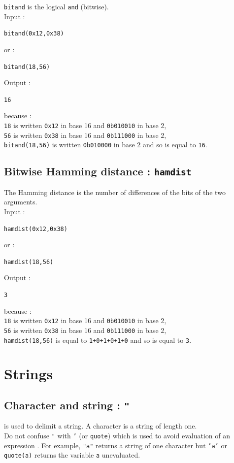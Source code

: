 \documentclass[a4paper,11pt]{book}
\begin{document}
{\tt bitand} is the logical {\tt and} (bitwise).\\
Input :
\begin{center}{\tt bitand(0x12,0x38)}\end{center}
or : 
\begin{center}{\tt bitand(18,56)}\end{center}
Output :
\begin{center}{\tt 16}\end{center}
because :\\
{\tt 18} is written {\tt 0x12} in base 16 and {\tt 0b010010} in base 2,\\
{\tt 56} is written {\tt 0x38} in base 16 and {\tt 0b111000} in base 2,\\
{\tt bitand(18,56)} is written {\tt 0b010000} in base 2 and so is equal to
{\tt 16}.

\subsection{Bitwise Hamming distance : {\tt hamdist}}
The Hamming distance is the number of differences
of the bits of the two arguments.\\
Input :
\begin{center}{\tt hamdist(0x12,0x38)}\end{center}
or : 
\begin{center}{\tt hamdist(18,56)}\end{center}
Output :
\begin{center}{\tt 3}\end{center}
because :\\
{\tt 18}  is written {\tt 0x12} in base 16 and {\tt 0b010010} in base 2,\\
{\tt 56}  is written {\tt 0x38} in base 16 and {\tt 0b111000} in base 2,\\
{\tt hamdist(18,56)} is equal to {\tt 1+0+1+0+1+0} and so is equal to {\tt 3}.

\section{Strings}
\subsection{Character and string : {\tt "}}
 is used to delimit a string.
A character is a string of length one.\\
Do not confuse {\tt "} with
{\tt '} (or {\tt quote}) which is used to avoid evaluation
of an expression . For example,
{\tt "a"} returns a string of one character 
but {\tt 'a'} or {\tt quote(a)} returns
the variable {\tt a} unevaluated.\\
\end{document}
